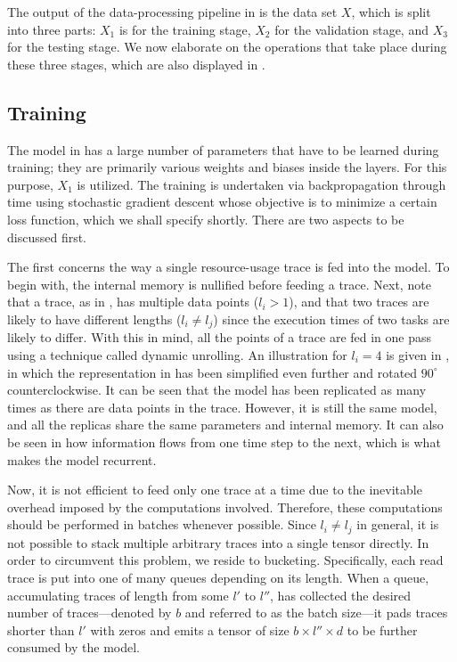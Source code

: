The output of the data-processing pipeline in  is the data set $X$,
which is split into three parts: $X_1$ is for the training stage, $X_2$ for the
validation stage, and $X_3$ for the testing stage. We now elaborate on the
operations that take place during these three stages, which are also displayed
in .

\subsection{Training} 
The model in  has a large number of parameters that have to be
learned during training; they are primarily various weights and biases inside
the layers. For this purpose, $X_1$ is utilized. The training is undertaken via
backpropagation through time using stochastic gradient descent
\cite{goodfellow2016} whose objective is to minimize a certain loss function,
which we shall specify shortly. There are two aspects to be discussed first.


The first concerns the way a single resource-usage trace is fed into the model.
To begin with, the internal memory is nullified before feeding a trace. Next,
note that a trace, as in , has multiple data points ($l_i > 1$), and
that two traces are likely to have different lengths ($l_i \neq l_j$) since the
execution times of two tasks are likely to differ. With this in mind, all the
points of a trace are fed in one pass using a technique called dynamic
unrolling. An illustration for $l_i = 4$ is given in , in which the
representation in  has been simplified even further and rotated
$90^\circ$ counterclockwise. It can be seen that the model has been replicated
as many times as there are data points in the trace. However, it is still the
same model, and all the replicas share the same parameters and internal memory.
It can also be seen in  how information flows from one time step to
the next, which is what makes the model recurrent.

Now, it is not efficient to feed only one trace at a time due to the inevitable
overhead imposed by the computations involved. Therefore, these computations
should be performed in batches whenever possible. Since $l_i \neq l_j$ in
general, it is not possible to stack multiple arbitrary traces into a single
tensor directly. In order to circumvent this problem, we reside to bucketing.
Specifically, each read trace is put into one of many queues depending on its
length. When a queue, accumulating traces of length from some $l'$ to $l''$, has
collected the desired number of traces---denoted by $b$ and referred to as the
batch size---it pads traces shorter than $l'$ with zeros and emits a tensor of
size $b \times l'' \times d$ to be further consumed by the model.

